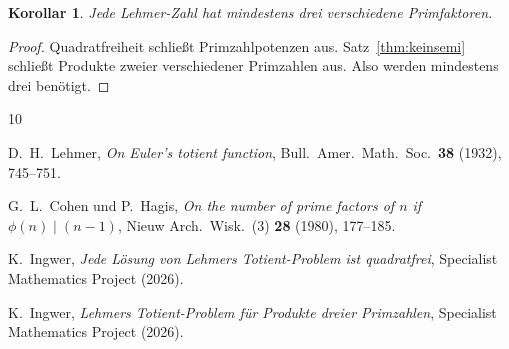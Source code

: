 \documentclass[12pt,a4paper]{amsart}
\newtheorem{corollary}[theorem]{Korollar}
\theoremstyle{definition}
\begin{document}
\begin{corollary}
Jede Lehmer-Zahl hat mindestens drei verschiedene Primfaktoren.
\end{corollary}

\begin{proof}
Quadratfreiheit \cite{Ingwer2026qfrei} schließt Primzahlpotenzen aus.
Satz~\ref{thm:keinsemi} schließt Produkte zweier verschiedener Primzahlen aus.
Also werden mindestens drei benötigt.
\end{proof}

\begin{thebibliography}{10}

D.~H.~Lehmer,
\emph{On Euler's totient function},
Bull.\ Amer.\ Math.\ Soc.\ \textbf{38} (1932), 745--751.

G.~L.~Cohen und P.~Hagis,
\emph{On the number of prime factors of $n$ if $\phi(n) \mid (n-1)$},
Nieuw Arch.\ Wisk.\ (3) \textbf{28} (1980), 177--185.

K.~Ingwer,
\emph{Jede Lösung von Lehmers Totient-Problem ist quadratfrei},
Specialist Mathematics Project (2026).

K.~Ingwer,
\emph{Lehmers Totient-Problem für Produkte dreier Primzahlen},
Specialist Mathematics Project (2026).

\end{thebibliography}
\end{document}
